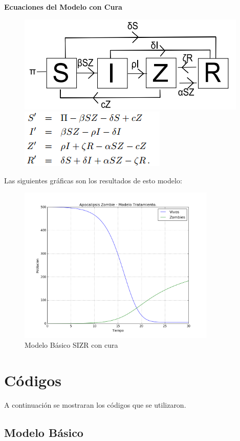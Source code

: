 \documentclass[12pt]{article}
\begin{document}
\textbf{Ecuaciones del Modelo con Cura}
\begin{figure}[H]
\centering
\includegraphics[scale=0.5]{CModeloG.png}
\hspace{0.5cm}
\includegraphics[scale=0.65]{CModelo.png}
\end{figure}

Las siguientes gráficas son los resultados de esto modelo:
\begin{figure}[H]
\centering
\includegraphics[height=7.5cm]{Tratamiento.png}
\caption{Modelo Básico SIZR con cura}
\end{figure} 
\pagebreak

\section{Códigos}
A continuación se mostraran los códigos que se utilizaron.
\subsection{Modelo Básico}

\end{document}

